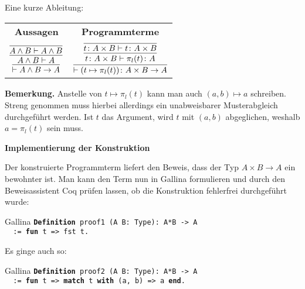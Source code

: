 \documentclass[8pt]{beamer}
\newcommand{\strong}[1]{\textsf{\textbf{#1}}}
\newcommand{\parspace}{\vspace{0.8em}}
\newcommand{\cond}{\rightarrow}
\newcommand{\kw}[1]{\textbf{#1}}
\begin{document}
\begin{frame}
Eine kurze Ableitung:

\vspace{1em}
\begin{center}
\begin{tabular}{c@{\qquad\qquad}c}
\strong{Aussagen} & \strong{Programmterme}\\[8pt]
$\infer{\vdash A\land B\cond A}{
  \infer{A\land B\vdash A}{
    \infer{A\land B\vdash A\land B}{}}}$
&
$\infer{\vdash (t\mapsto \pi_l(t))\colon A\times B\to A}{
  \infer{t\colon A\times B\vdash \pi_l(t)\colon A}{
    \infer{t\colon A\times B\vdash t\colon A\times B}{}}}$
\end{tabular}
\end{center}\pause

\parspace
\strong{Bemerkung.}
Anstelle von $t\mapsto\pi_l(t)$ kann man auch $(a,b)\mapsto a$
schreiben. Streng genommen muss hierbei allerdings ein unabweisbarer
Musterabgleich durchgeführt werden. Ist $t$ das Argument, wird $t$
mit $(a,b)$ abgeglichen, weshalb $a=\pi_l(t)$ sein muss.
\end{frame}

\begin{frame}[t]
\strong{Implementierung der Konstruktion}

\vspace{4em}
Der konstruierte Programmterm liefert den Beweis, dass der Typ
$A\times B\to A$ ein bewohnter ist. Man kann den Term nun in
Gallina formulieren und durch den Beweisassistent Coq prüfen lassen,
ob die Konstruktion fehlerfrei durchgeführt wurde:\pause

\begin{block}{Gallina}
\texttt{\kw{Definition} proof1 (A B: Type): A*B -> A\\
\ \ := \kw{fun} t => fst t.}
\end{block}\pause

\parspace
Es ginge auch so:
\begin{block}{Gallina}
\texttt{\kw{Definition} proof2 (A B: Type): A*B -> A\\
\ \ := \kw{fun} t => \kw{match} t \kw{with} (a, b) => a \kw{end}.}
\end{block}
\end{frame}
\end{document}
